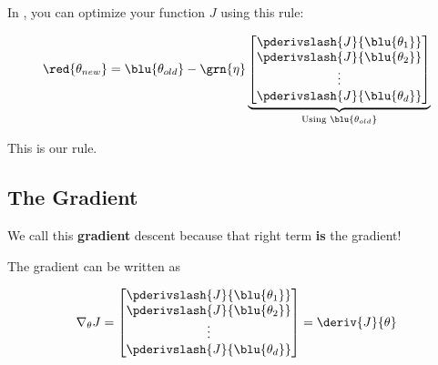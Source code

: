         \begin{kequation}
            In , you can optimize your function $J$ using this rule:
            
            \begin{equation*}
                \red{ \theta_{new} } =  \blu{ \theta_{old} } 
                - \grn{ \eta } 
                \underbrace{
                    \begin{bmatrix}
                          \pderivslash{J}{ \blu{\theta_1} } \\ 
                          \pderivslash{J}{ \blu{\theta_2} } \\
                          \vdots \\
                          \pderivslash{J}{ \blu{\theta_d} } \\
                    \end{bmatrix}
                }_{ \text{Using } \blu{ \theta_{old} } }
            \end{equation*}
            
            This is our  rule.
        \end{kequation}

    \subsection{The Gradient}
    
        We call this \textbf{gradient} descent because that right term \textbf{is} the gradient!\\
        
        \begin{definition}
            
            The gradient can be written as
            
            \begin{equation*}
                \nabla_\theta J 
                = 
                \begin{bmatrix}
                      \pderivslash{J}{ \blu{\theta_1} } \\ 
                      \pderivslash{J}{ \blu{\theta_2} } \\
                      \vdots \\
                      \pderivslash{J}{ \blu{\theta_d} } \\
                \end{bmatrix}
                =
                \deriv{J}{\theta}
            \end{equation*} 
        \end{definition}
        
